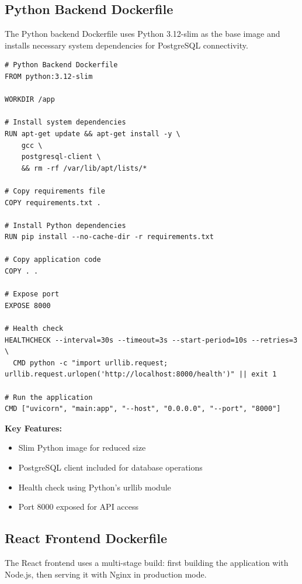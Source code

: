 \documentclass[12pt,a4paper]{article}
\begin{document}
\subsection{Python Backend Dockerfile}

The Python backend Dockerfile uses Python 3.12-slim as the base image and installs necessary system dependencies for PostgreSQL connectivity.

\begin{lstlisting}[style=dockerfile, caption={Python Backend Dockerfile}, label={lst:python-dockerfile}]
# Python Backend Dockerfile
FROM python:3.12-slim

WORKDIR /app

# Install system dependencies
RUN apt-get update && apt-get install -y \
    gcc \
    postgresql-client \
    && rm -rf /var/lib/apt/lists/*

# Copy requirements file
COPY requirements.txt .

# Install Python dependencies
RUN pip install --no-cache-dir -r requirements.txt

# Copy application code
COPY . .

# Expose port
EXPOSE 8000

# Health check
HEALTHCHECK --interval=30s --timeout=3s --start-period=10s --retries=3 \
  CMD python -c "import urllib.request; urllib.request.urlopen('http://localhost:8000/health')" || exit 1

# Run the application
CMD ["uvicorn", "main:app", "--host", "0.0.0.0", "--port", "8000"]
\end{lstlisting}

\textbf{Key Features:}
\begin{itemize}
    \item Slim Python image for reduced size
    \item PostgreSQL client included for database operations
    \item Health check using Python's urllib module
    \item Port 8000 exposed for API access
\end{itemize}

\subsection{React Frontend Dockerfile}

The React frontend uses a multi-stage build: first building the application with Node.js, then serving it with Nginx in production mode.
\end{document}
